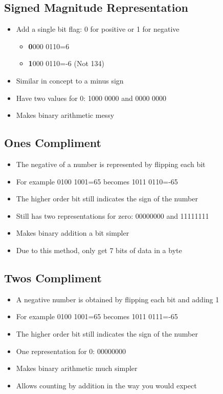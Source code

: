 \documentclass{article}[18pt]
\begin{document}
\subsection{Signed Magnitude Representation}
\begin{itemize}
\item Add a single bit flag: 0 for positive or 1 for negative
\begin{itemize}
\item \textbf{0}000 0110=6
\item \textbf{1}000 0110=-6 (Not 134)
\end{itemize}
\item Similar in concept to a minus sign
\item Have two values for 0: 1000 0000 and 0000 0000
\item Makes binary arithmetic messy
\end{itemize}
\subsection{Ones Compliment}
\begin{itemize}
\item The negative of a number is represented by flipping each bit
\item For example 0100 1001=65 becomes 1011 0110=-65
\item The higher order bit still indicates the sign of the number
\item Still has two representations for zero: 00000000 and 11111111
\item Makes binary addition a bit simpler
\item Due to this method, only get 7 bits of data in a byte
\end{itemize}
\subsection{Twos Compliment}
\begin{itemize}
\item A negative number is obtained by flipping each bit and adding 1
\item For example 0100 1001=65 becomes 1011 0111=-65
\item The higher order bit still indicates the sign of the number
\item One representation for 0: 00000000
\item Makes binary arithmetic much simpler
\item Allows counting by addition in the way you would expect
\end{itemize}
\end{document}
